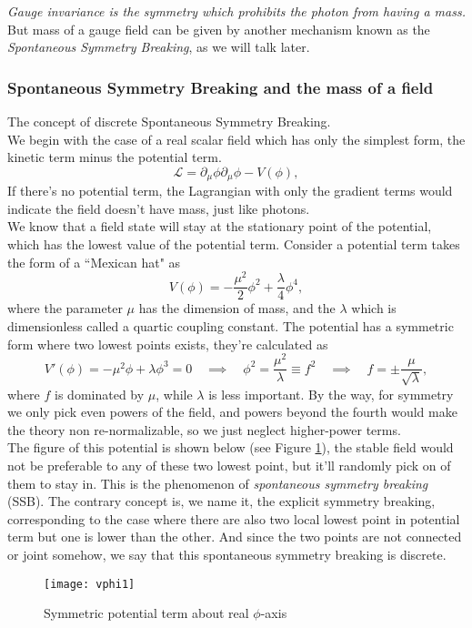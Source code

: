 \documentclass{article}
\newcommand{\be}{\begin{equation}}
\newcommand{\ee}{\end{equation}}
\newcommand{\p}{\partial}
\renewcommand{\1}{\left}
\renewcommand{\2}{\right}
\newcommand{\ma}{\mathcal}
\newcommand{\rar}{\quad\implies\quad}
\newcommand{\m}{\mu}
\begin{document}
\textit{Gauge invariance is the symmetry which prohibits the photon from having a mass.}\\

 But mass of a gauge field can be given by another mechanism known as the \textit{Spontaneous Symmetry Breaking}, as we will talk later.
 
\subsubsection{Spontaneous Symmetry Breaking and the mass of a field}
The concept of discrete Spontaneous Symmetry Breaking.\\
We begin with the case of a real scalar field which has only the simplest form, the kinetic term minus the potential term.
\be
\ma L=\p_\m \phi\p_\m \phi-V(\phi),
\ee
If there's no potential term, the Lagrangian with only the gradient terms would indicate the field doesn't have mass, just like photons.\\ %
We know that a field state will stay at the stationary point of the potential, which has the lowest value of the potential term. Consider a potential term takes the form of a ``Mexican hat" as
\be
V(\phi)=-\frac{\m^2}{2}\phi^2+\frac{\lambda}{4}\phi^4,
\ee
where the parameter $\m$ has the dimension of mass, and the $\lambda$ which is dimensionless called a quartic coupling constant. The potential has a symmetric form where two lowest points exists,
they're calculated as
\be
V'(\phi)=-\m^2\phi+\lambda\phi^3=0 \rar \phi^2=\frac{\m^2}{\lambda}\equiv f^2 \rar f=\pm\frac{\m}{\sqrt{\lambda}},
\ee
where $f$ is dominated by $\m$, while $\lambda$ is less important. By the way, for symmetry we only pick even powers of the field, and powers beyond the fourth would make the theory non re-normalizable, so we just neglect higher-power terms.\\
The figure of this potential is shown below (see Figure \ref{vphi1}), the stable field would not be preferable to any of these two lowest point, but it'll randomly pick on of them to stay in. This is the phenomenon of \textit{spontaneous symmetry breaking} (SSB). The contrary concept is, we name it, the explicit symmetry breaking, corresponding to the case where there are also two local lowest point in potential term but one is lower than the other. And since the two points are not connected or joint somehow, we say that this spontaneous symmetry breaking is discrete.
\begin{figure}[h]
\centering
\texttt{[image: vphi1]}
\caption{\label{vphi1}Symmetric potential term about real $\phi$-axis}
\end{figure}\\
\end{document}
